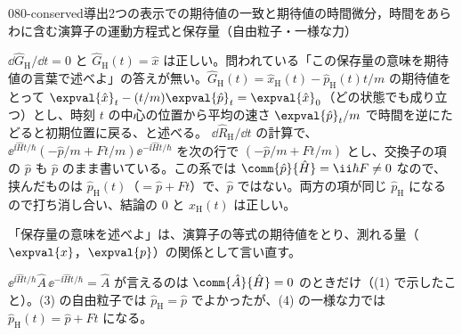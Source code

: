 \documentclass[uplatex,dvipdfmx,a4paper,11pt]{jsarticle}
\begin{document}
\begin{mondai}{080-conserved}{導出}{2つの表示での期待値の一致と期待値の時間微分，時間をあらわに含む演算子の運動方程式と保存量（自由粒子・一様な力）}
\begin{kotaeran}
   $\dd\hat{G}_{\mathrm{H}}/\dd t=0$ と $\hat{G}_{\mathrm{H}}(t)=\hat{x}$ は正しい。問われている「この保存量の意味を期待値の言葉で述べよ」の答えが無い。$\hat{G}_{\mathrm{H}}(t)=\hat{x}_{\mathrm{H}}(t)-\hat{p}_{\mathrm{H}}(t)t/m$ の期待値をとって $\expval{\hat{x}}_{t}-(t/m)\expval{\hat{p}}_{t}=\expval{\hat{x}}_{0}$（どの状態でも成り立つ）とし、時刻 $t$ の中心の位置から平均の速さ $\expval{\hat{p}}_{t}/m$ で時間を逆にたどると初期位置に戻る、と述べる。
   $\dd\hat{R}_{\mathrm{H}}/\dd t$ の計算で、$\ee^{\ii\hat{H}t/\hbar}(-\hat{p}/m+Ft/m)\ee^{-\ii\hat{H}t/\hbar}$ を次の行で $(-\hat{p}/m+Ft/m)$ とし、交換子の項の $\hat{p}$ も $\hat{p}$ のまま書いている。この系では $\comm{\hat{p}}{\hat{H}}=\ii\hbar F\neq0$ なので、挟んだものは $\hat{p}_{\mathrm{H}}(t)$（$=\hat{p}+Ft$）で、$\hat{p}$ ではない。両方の項が同じ $\hat{p}_{\mathrm{H}}$ になるので打ち消し合い、結論の $0$ と $\hat{x}_{\mathrm{H}}(t)$ は正しい。
\end{kotaeran}
\begin{rikai}
  \item 「保存量の意味を述べよ」は、演算子の等式の期待値をとり、測れる量（$\expval{x}$，$\expval{p}$）の関係として言い直す。
  \item $\ee^{\ii\hat{H}t/\hbar}\hat{A}\,\ee^{-\ii\hat{H}t/\hbar}=\hat{A}$ が言えるのは $\comm{\hat{A}}{\hat{H}}=0$ のときだけ（(1) で示したこと）。(3) の自由粒子では $\hat{p}_{\mathrm{H}}=\hat{p}$ でよかったが、(4) の一様な力では $\hat{p}_{\mathrm{H}}(t)=\hat{p}+Ft$ になる。
\end{rikai}
\end{mondai}
\end{document}
